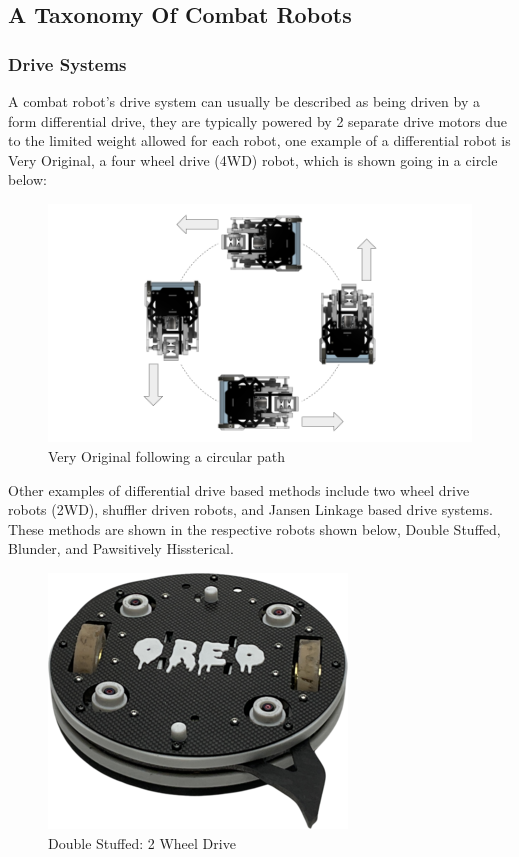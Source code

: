 \documentclass[conference]{IEEEtran}
\begin{document}
\subsection{A Taxonomy Of Combat Robots}
\subsubsection{Drive Systems}

A combat robot's drive system can usually be described as being driven by a form differential drive, they are typically powered by 2 separate drive motors due to the limited weight allowed for each robot, one example of a differential robot is Very Original, a four wheel drive (4WD) robot, which is shown going in a circle below:
\begin{figure}[htp]
\centering
\includegraphics[scale=0.3]{Differential Drive 4WD.png}
\caption{Very Original following a circular path}
\label{Very Original Following a circular path}
\end{figure} 

Other examples of differential drive based methods include two wheel drive robots (2WD), shuffler driven robots, and Jansen Linkage based drive systems.  These methods are shown in the respective robots shown below, Double Stuffed, Blunder, and Pawsitively Hissterical.
\begin{figure}[htp]
\centering
\includegraphics[scale=0.4]{doublestuffed.png}
\caption{Double Stuffed: 2 Wheel Drive \cite{b2}}
\label{Double Stuffed: 2 Wheel Drive}
\end{figure}
\end{document}
